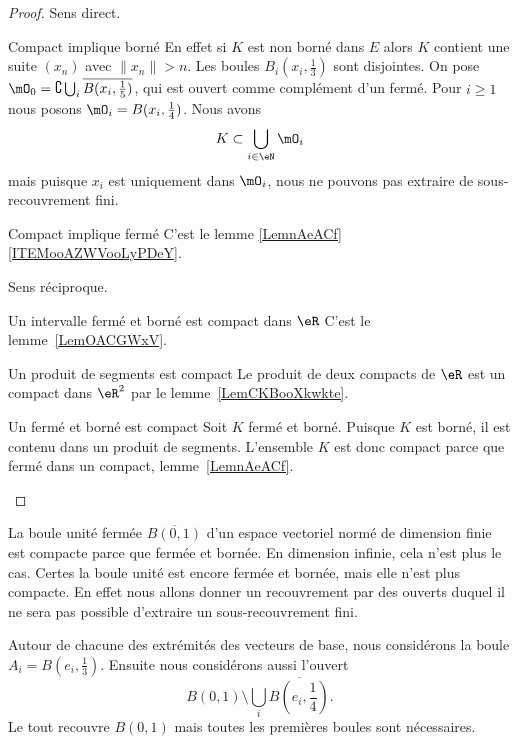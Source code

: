 \begin{proof}
	Sens direct.
	\begin{subproof}
		\item[Compact implique borné]
		En effet si \( K\) est non borné dans \( E\) alors \( K\) contient une suite \( (x_n)\) avec \( \| x_n \|>n\). Les boules \( B_i(x_i,\frac{ 1 }{3})\) sont disjointes. On pose \( \mO_0=\complement\bigcup_i\overline{ B(x_i,\frac{1}{ 5 }) }\), qui est ouvert comme complément d'un fermé. Pour \( i\geq 1\) nous posons \( \mO_i=B(x_i,\frac{1}{ 4 })\). Nous avons
		\begin{equation}
			K\subset\bigcup_{i\in \eN}\mO_i
		\end{equation}
		mais puisque \( x_i\) est uniquement dans \( \mO_i\), nous ne pouvons pas extraire de sous-recouvrement fini.
		\item[Compact implique fermé]
		C'est le lemme \ref{LemnAeACf}\ref{ITEMooAZWVooLyPDeY}.
	\end{subproof}
	Sens réciproque.
	\begin{subproof}
		\item[Un intervalle fermé et borné est compact dans \( \eR\)]
		C'est le lemme~\ref{LemOACGWxV}.
		\item[Un produit de segments est compact]
		Le produit de deux compacts de \( \eR\) est un compact dans \( \eR^2\) par le lemme~\ref{LemCKBooXkwkte}.
		\item[Un fermé et borné est compact]
		Soit \( K\) fermé et borné. Puisque \( K\) est borné, il est contenu dans un produit de segments. L'ensemble \( K\) est donc compact parce que fermé dans un compact, lemme~\ref{LemnAeACf}.
	\end{subproof}
\end{proof}

\begin{example}
	La boule unité fermée \( \overline{ B(0,1) }\) d'un espace vectoriel normé de dimension finie est compacte parce que fermée et bornée. En dimension infinie, cela n'est plus le cas. Certes la boule unité est encore fermée et bornée, mais elle n'est plus compacte. En effet nous allons donner un recouvrement par des ouverts duquel il ne sera pas possible d'extraire un sous-recouvrement fini.

	Autour de chacune des extrémités des vecteurs de base, nous considérons la boule \( A_i=B(e_i,\frac{1}{ 3 })\). Ensuite nous considérons aussi l'ouvert
	\begin{equation}
		B(0,1)\setminus\bigcup_i\overline{ B(e_i,\frac{1}{ 4 })}.
	\end{equation}
	Le tout recouvre \( B(0,1)\) mais toutes les premières boules sont nécessaires.
\end{example}

